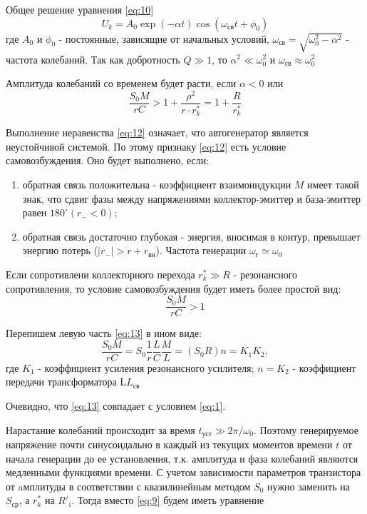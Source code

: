 Общее решение уравнения \eqref{eq:10}
\begin{equation*}
U_k=A_0\exp(-\alpha t)\cos(\omega_\text{св}t+\phi_0)
\end{equation*}
где $A_0$ и $\phi_0$ - постоянные, зависящие от начальных условий, $\omega_\text{св}=\sqrt{\omega_0^2-\alpha^2}$ - частота колебаний. Так как добротность $Q\gg1$, то $\alpha^2\ll \omega_0^2$ и $\omega_\text{св}\approx\omega_0^2$

Амплитуда колебаний со временем будет расти, если $\alpha<0$ или 
\begin{equation}
\frac{S_0M}{rC}>1+\frac{\rho^2}{r\cdot r_k^*}=1+\frac{R}{r_k^*}
\label{eq:12}
\end{equation}

Выполнение неравенства \eqref{eq:12} означает, что автогенератор является неустойчивой системой. По этому признаку \eqref{eq:12} есть условие самовозбуждения. Оно будет выполнено, если:
\begin{enumerate}
\item обратная связь положительна - коэффициент взаимоиндукции $M$ имеет такой знак, что сдвиг фазы между напряжениями коллектор-эмиттер и база-эмиттер равен $180^{\circ} (r_{-}<0)$;
\item обратная связь достаточно глубокая - энергия, вносимая в контур, превышает энергию потерь ($|r_{-}|>r+r_\text{вн}$). Частота генерации $\omega_\text{г}\simeq\omega_0$
\end{enumerate}

Если сопротивлени коллекторного перехода $r_k^*\gg R$ - резонансного сопротивления, то условие самовозбуждения будет иметь более простой вид:
\begin{equation}
\frac{S_0M}{rC}>1
\label{eq:13}
\end{equation}

Перепишем левую часть \eqref{eq:13} в ином виде:
\begin{equation*}
\frac{S_0M}{rC}=S_0\frac{1}{r}\frac{L}{C}\frac{M}{L}=(S_0R)n=K_1K_2,
\end{equation*}
где $K_1$ - коэффициент усиления резонансного усилителя; $n=K_2$ - коэффициент передачи трансформатора L\textdiv $L_\text{св}$

Очевидно, что \eqref{eq:13} совпадает с условием \eqref{eq:1}.

Нарастание колебаний происходит за время $t_\text{уст}\gg 2\pi / \omega_0$. Поэтому генерируемое напряжение почти синусоидально в каждый из текущих моментов времени $t$ от начала генерации до ее установления, т.к. амплитуда и фаза колебаний являются медленными функциями времени. С учетом зависимости параметров транзистора от aмплитуды в соответствии с квазилинейным методом $S_0$ нужно заменить на $S_\text{ср}$, а $r_k^*$ на $R'_i$. Тогда вместо \eqref{eq:9} будем иметь уравнение 

